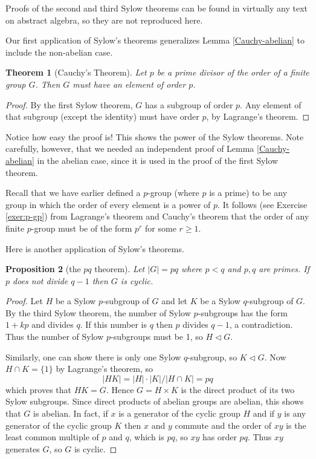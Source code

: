 \documentclass[11pt,oneside]{article}
\newtheorem{thm}{Theorem}[section]
\newtheorem{prop}[thm]{Proposition}
\theoremstyle{definition}
\begin{document}
Proofs of the second and third Sylow theorems can be found in
virtually any text on abstract algebra, so they are not reproduced
here.

Our first application of Sylow's theorems generalizes Lemma
\ref{Cauchy-abelian} to include the non-abelian case.


\begin{thm}[Cauchy's Theorem]\label{Cauchy} 
Let $p$ be a prime divisor of the order of a finite group $G$. Then
$G$ must have an element of order $p$.
\end{thm}

\begin{proof}
By the first Sylow theorem, $G$ has a subgroup of order $p$. Any
element of that subgroup (except the identity) must have order $p$, by
Lagrange's theorem. 
\end{proof}

Notice how easy the proof is! This shows the power of the Sylow
theorems. Note carefully, however, that we needed an independent proof
of Lemma \ref{Cauchy-abelian} in the abelian case, since it is used
in the proof of the first Sylow theorem.  

Recall that we have earlier defined a $p$-group (where $p$ is a prime)
to be any group in which the order of every element is a power of $p$.
It follows (see Exercise \ref{exer:p-gp}) from Lagrange's theorem and
Cauchy's theorem that the order of any finite $p$-group must be of the
form $p^r$ for some $r \ge 1$.

Here is another application of Sylow's theorems.

\begin{prop}[the $pq$ theorem] \label{pq}
Let $|G| = pq$ where $p<q$ and $p,q$ are primes. If $p$ does not
divide $q-1$ then $G$ is cyclic.
\end{prop}


\begin{proof}
Let $H$ be a Sylow $p$-subgroup of $G$ and let $K$ be a Sylow
$q$-subgroup of $G$. By the third Sylow theorem, the number of Sylow
$p$-subgroups has the form $1+kp$ and divides $q$. If this number is
$q$ then $p$ divides $q-1$, a contradiction. Thus the number of Sylow
$p$-subgroups must be 1, so $H\triangleleft G$.

Similarly, one can show there is only one Sylow $q$-subgroup, so $K
\triangleleft G$.  Now $H \cap K = \{1\}$ by Lagrange's theorem, 
so
\[
  |HK| = |H|\cdot|K|/|H\cap K| = pq 
\]
which proves that $HK=G$. Hence $G = H \times K$ is the direct product
of its two Sylow subgroups. Since direct products of abelian groups
are abelian, this shows that $G$ is abelian. In fact, if $x$ is a
generator of the cyclic group $H$ and if $y$ is any generator of the
cyclic group $K$ then $x$ and $y$ commute and the order of $xy$ is the
least common multiple of $p$ and $q$, which is $pq$, so $xy$ has order
$pq$. Thus $xy$ generates $G$, so $G$ is cyclic.
\end{proof}
\end{document}
